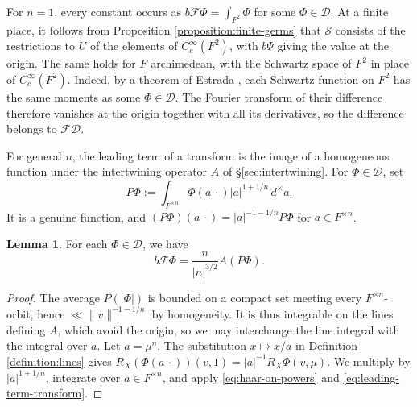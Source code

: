 \documentclass[reqno]{amsart}
\theoremstyle{plain}
\theoremstyle{definition}
\theoremstyle{itplain}
\newtheorem{lemma}[theorem]{Lemma}
\numberwithin{equation}{section}
\numberwithin{theorem}{section}
\begin{document}
For $n = 1$, every constant occurs as $b \mathcal{F} \Phi = \int_{F^2} \Phi$ for some $\Phi \in \mathcal{D}$.  At a finite place, it follows from Proposition \ref{proposition:finite-germs} that $\mathcal{S}$ consists of the restrictions to $U$ of the elements of $C_c^\infty(F^2)$, with $b \Psi$ giving the value at the origin.  The same holds for $F$ archimedean, with the Schwartz space of $F^2$ in place of $C_c^\infty(F^2)$.  Indeed, by a theorem of Estrada \cite[Theorem~4.1]{Estrada1998VectorMoment}, each Schwartz function on $F^2$ has the same moments as some $\Phi \in \mathcal{D}$.  The Fourier transform of their difference therefore vanishes at the origin together with all its derivatives, so the difference belongs to $\mathcal{F} \mathcal{D}$.

For general $n$, the leading term of a transform is the image of a homogeneous function under the intertwining operator $A$ of \S\ref{sec:intertwining}.  For $\Phi \in \mathcal{D}$, set
\begin{equation*}
  P \Phi := \int_{F^{\times n}} \Phi(a \, \cdot) \lvert a \rvert^{1 + 1/n} \, d^\times a.
\end{equation*}
It is a genuine function, and $(P \Phi)(a \, \cdot) = \lvert a \rvert^{-1 - 1/n} P \Phi$ for $a \in F^{\times n}$.

\begin{lemma}\label{lemma:germ-via-average}
  For each $\Phi \in \mathcal{D}$, we have
  \begin{equation}\label{eq:germ-via-average}
    b \mathcal{F} \Phi = \frac{n}{\lvert n \rvert^{3/2}} A(P \Phi).
  \end{equation}
\end{lemma}
\begin{proof}
  The average $P(\lvert \Phi \rvert)$ is bounded on a compact set meeting every $F^{\times n}$-orbit, hence $\ll \lVert v \rVert^{-1 - 1/n}$ by homogeneity.  It is thus integrable on the lines defining $A$, which avoid the origin, so we may interchange the line integral with the integral over $a$.  Let $a = \mu^n$.  The substitution $x \mapsto x / a$ in Definition \ref{definition:lines} gives $R_X (\Phi(a \, \cdot))(v, 1) = \lvert a \rvert^{-1} R_X \Phi(v, \mu)$.  We multiply by $\lvert a \rvert^{1 + 1/n}$, integrate over $a \in F^{\times n}$, and apply \eqref{eq:haar-on-powers} and \eqref{eq:leading-term-transform}.
\end{proof}
\end{document}
